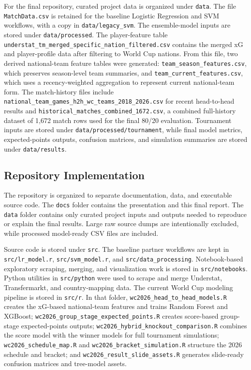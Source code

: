 \documentclass[11pt]{article}
\newcommand{\codepath}[1]{\nolinkurl{#1}}
\begin{document}
For the final repository, curated project data is organized under \codepath{data}. The file \codepath{MatchData.csv} is retained for the baseline Logistic Regression and SVM workflows, with a copy in \codepath{data/legacy_svm}. The ensemble-model inputs are stored under \codepath{data/processed}. The player-feature table \codepath{understat_tm_merged_specific_nation_filtered.csv} contains the merged xG and player-profile data after filtering to World Cup nations. From this file, two derived national-team feature tables were generated: \codepath{team_season_features.csv}, which preserves season-level team summaries, and \codepath{team_current_features.csv}, which uses a recency-weighted aggregation to represent current national-team form. The match-history files include \codepath{national_team_games_h2h_wc_teams_2018_2026.csv} for recent head-to-head results and \codepath{historical_matches_combined_1672.csv}, a combined full-history dataset of 1,672 match rows used for the final 80/20 evaluation. Tournament inputs are stored under \codepath{data/processed/tournament}, while final model metrics, expected-points outputs, confusion matrices, and simulation summaries are stored under \codepath{data/results}.

\subsection{Repository Implementation}

The repository is organized to separate documentation, data, and executable source code. The \codepath{docs} folder contains the presentation and this final report. The \codepath{data} folder contains only curated project inputs and outputs needed to reproduce or explain the final results. Large raw source dumps are intentionally excluded, while processed model-ready CSV files are included.

Source code is stored under \codepath{src}. The baseline partner workflows are kept in \codepath{src/lr_model.r}, \codepath{src/svm_model.r}, and \codepath{src/data_processing}. Notebook-based exploratory scraping, merging, and visualization work is stored in \codepath{src/notebooks}. Python utilities in \codepath{src/python} were used to scrape and merge Understat, Transfermarkt, and country-mapping data. The current World Cup modeling pipeline is stored in \codepath{src/r}. In that folder, \codepath{wc2026_head_to_head_models.R} creates the xG-based national-team features and trains Random Forest and XGBoost; \codepath{wc2026_group_stage_expected_points.R} creates score-based group-stage expected-points outputs; \codepath{wc2026_hybrid_knockout_comparison.R} combines the score model with the winner models for full tournament simulations; \codepath{wc2026_schedule_map.R} and \codepath{wc2026_bracket_simulation.R} structure the 2026 schedule and bracket; and \codepath{wc2026_result_slide_assets.R} generates slide-ready confusion matrices and tree-model assets.
\end{document}
